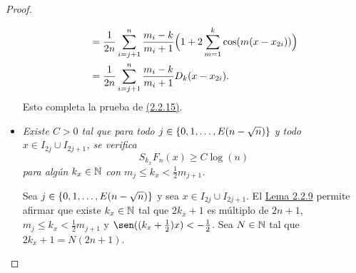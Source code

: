 \documentclass[a4paper, 12pt]{book}
\begin{document}
\begin{proof}
\begin{itemize}
\begin{align*}
            &= \frac{1}{2n}\sum_{i=j+1}^n \frac{m_i-k}{m_i+1}\Bigl(1+2\sum_{m=1}^{k} \cos(m(x-x_{2i}))\Bigr) \\
            &= \frac{1}{2n}\sum_{i=j+1}^n \frac{m_i-k}{m_i+1}D_{k}(x-x_{2i}).
        \end{align*}
        Esto completa la prueba de \hyperref[2.2.15]{(2.2.15)}.
        \item \textit{Existe $C > 0$ tal que para todo $j \in \{0,1,\mathellipsis,E(n-\sqrt{n})\}$ y todo $x \in I_{2j}\cup I_{2j+1}$, se verifica
        \begin{equation}\label{2.2.16}
            S_{k_x}F_n(x) \geq C\log(n)
        \end{equation}
        para algún $k_x \in \mathbb N$ con $m_j \leq k_x < \frac{1}{2}m_{j+1}$.
        }

        Sea $j \in \{0,1,\mathellipsis,E(n-\sqrt{n})\}$ y sea $x \in I_{2j} \cup I_{2j+1}$. El \hyperref[2.2.9]{Lema 2.2.9} permite afirmar que existe $k_x \in \mathbb N$ tal que $2k_x+1$ es múltiplo de $2n+1$, $m_{j} \leq k_x < \frac{1}{2}m_{j+1}$ y $\sen((k_x+\frac{1}{2})x) < -\frac{1}{2}$. Sea $N \in \mathbb N$ tal que $2k_x+1 = N(2n+1)$.


\end{itemize}
\end{proof}
\end{document}

